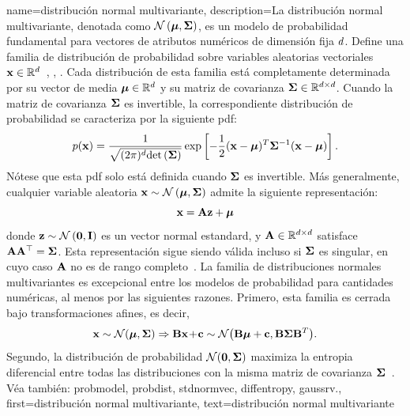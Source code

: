 		{name={distribución normal multivariante}, 
			description={La distribución normal multivariante, 
				denotada como $\mathcal{N}\left({\bm \mu},{\bf \Sigma}\right)$, es un modelo de probabilidad fundamental 
				para vectores de atributos numéricos de dimensión fija $d$. 
				Define una familia de distribución de probabilidad sobre variables aleatorias vectoriales 
				${\bf x} \in \mathbb{R}^{d}$~\cite{BertsekasProb}, \cite{GrayProbBook}, \cite{Lapidoth09}. 
				Cada distribución de esta familia está completamente determinada por su vector de media 
				${\bm \mu} \in \mathbb{R}^{d}$ y su matriz de covarianza
				${\bf \Sigma} \in \mathbb{R}^{d \times d}$. Cuando la 
				matriz de covarianza ${\bf \Sigma}$ es invertible, la correspondiente distribución de probabilidad se caracteriza por 
				la siguiente pdf:
				\[p({\bf x}) = 
				 \frac{1}{\sqrt{(2\pi)^{d} {\rm det}\left( {\bf \Sigma} \right)}} 
				 \exp\left[ -\frac{1}{2} 
				 ({\bf x} - {\bm \mu})^T {\bf \Sigma}^{-1} 
				 ({\bf x} - {\bm \mu}) \right].
				 \]
				Nótese que esta pdf solo está definida cuando ${\bf \Sigma}$ es invertible.
				   Más generalmente, cualquier variable aleatoria ${\bf x} \sim \mathcal{N}\left({\bm \mu},{\bf \Sigma}\right)$ 
				   admite la siguiente representación:
				  \[
					{\bf x} = {\bf A} {\bf z} + {\bm \mu}
				   \]
				   donde ${\bf z} \sim \mathcal{N}\left(\mathbf{0},\mathbf{I}\right)$ es un vector normal estandard,  
				   y ${\bf A} \in \mathbb{R}^{d \times d}$ satisface ${\bf A} {\bf A}^\top = {\bf \Sigma}$. 
				   Esta representación sigue siendo válida incluso si ${\bf \Sigma}$ es singular, en cuyo caso ${\bf A}$ 
				   no es de rango completo~\cite[Ch. 23]{Lapidoth2017}.
				   La familia de distribuciones normales multivariantes es excepcional entre los modelos de probabilidad para 
				   cantidades numéricas, al menos por las siguientes razones. Primero, esta familia es cerrada bajo 
				   transformaciones afines, es decir,
				\[ 
				{\bf x} \sim \mathcal{N}({\bm \mu},{\bf \Sigma}) \Rightarrow 
				{\bf B}{\bf x}\!+\!{\bf c} \sim \mathcal{N}\big( {\bf B}{\bm \mu}+{\bf c},{\bf B} {\bf \Sigma} {\bf B}^{T} \big). 
				\]
				Segundo, la distribución de probabilidad $\mathcal{N}(\mathbf{0},{\bf \Sigma})$ maximiza la 
				entropia diferencial entre todas las distribuciones con la misma matriz de covarianza ${\bf \Sigma}$~\cite{coverthomas}. 
				\\ 
				Véa también: \gls{probmodel}, \gls{probdist}, \gls{stdnormvec}, \gls{diffentropy}, \gls{gaussrv}.}, 
			first={distribución normal multivariante},
			text={distribución normal multivariante}
		}
		


